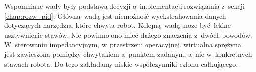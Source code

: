 Wspomniane wady były podstawą decyzji o~implementacji rozwiązania z~sekcji \ref{chap:rozw_pid}. Główną wadą jest niemożność wyekstrahowania danych dotyczących narzędzia, które chwyta robot. Kolejną wadą może być lekkie usztywnienie stawów. Nie powinno ono mieć dużego znaczenia z~dwóch powodów. W~sterowaniu impedancyjnym, w~przestrzeni operacyjnej, wirtualna sprężyna jest zawieszona pomiędzy chwytakiem a~punktem zadanym, a~nie w~konkretnych stawach robota. Do tego zakładamy niskie współczynniki członu całkującego.








